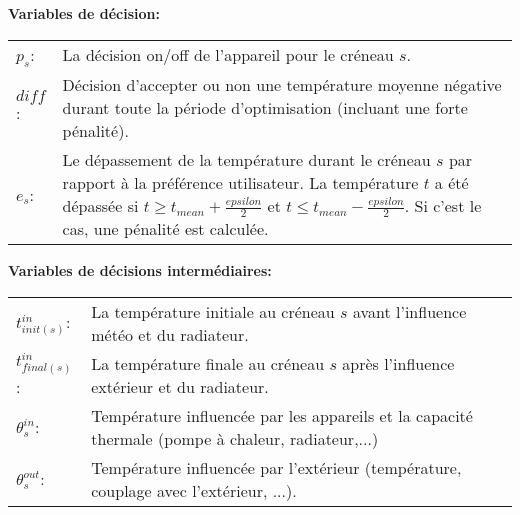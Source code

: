 \documentclass{article}
\begin{document}
\noindent
\textbf{Variables de décision:} \\
\begin{tabular}{ l p{} }
$p_s$: & La décision on/off de l'appareil pour le créneau $s$. \\
$diff$: & Décision d'accepter ou non une température moyenne négative durant toute la période d'optimisation (incluant une forte pénalité). \\
$e_s$: & Le dépassement de la température durant le créneau $s$ par rapport à la préférence utilisateur. La température $t$ a été dépassée si  $t \ge t_{mean} + \frac {epsilon}{2}$ et $t \le t_{mean} - \frac {epsilon}{2}$. Si c'est le cas, une pénalité est calculée.  \\
\end{tabular} 
\vspace{0.3cm}

\noindent
\textbf{Variables de décisions intermédiaires:} \\
\begin{tabular}{ l p{} }
$t^{in}_{init(s)}$: & La température initiale au créneau $s$ avant l'influence météo et du radiateur.\\
$t^{in}_{final(s)}$: & La température finale au créneau $s$ après l'influence extérieur et du radiateur. \\
$\theta^{in}_{s}$: & Température influencée par les appareils et la capacité thermale (pompe à chaleur, radiateur,...) \\
$\theta^{out}_{s}$: & Température influencée par l'extérieur (température, couplage avec l'extérieur, ...).\\
  
\end{tabular} 
  
  
\end{document}
